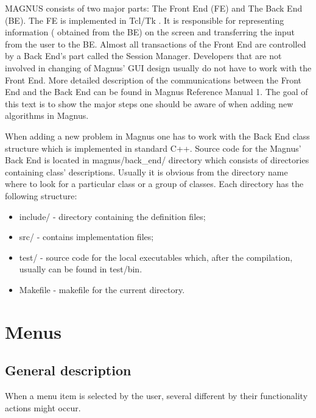 \documentclass[12pt]{article}
\begin{document}
  \pagestyle{myheadings} 


          MAGNUS consists of two major parts: The Front End (FE) and  The Back End 
  (BE). 
  The FE is implemented in Tcl/Tk . It is responsible for representing information 
  ( 
  obtained from the BE) on the screen and transferring the input from the user to 
  the BE. 
  Almost all transactions of the Front End are controlled by a Back End's part 
  called the 
  Session Manager. Developers  that are not involved in changing of Magnus' GUI 
  design 
  usually do not have to work with the Front End. More detailed description of the 
  communications between the Front End and the Back End can be found in Magnus 
  Reference
   Manual 1. The goal of this text is to show the  major steps one should be aware 
  of 
  when  adding  new  algorithms in Magnus.

          When adding a new problem in Magnus  one has to work with the Back End 
  class 
  structure  which  is implemented  in standard C++.
  Source code for the Magnus' Back End is located in magnus/back\_end/ directory 
  which
  consists of directories containing class' descriptions. Usually it is obvious 
  from the
   directory name where to look for a particular class or a group of classes. Each
   directory has the following structure: 

  \begin{itemize}
  \item include/ - directory containing the definition files;
  \item src/ - contains implementation files;
  \item test/ -  source code for the local executables which, after the 
  compilation,
   usually can be found in test/bin.
  \item Makefile - makefile for the current directory.
  \end{itemize}

  \section{Menus}

  \subsection{General description}
  When a menu item is selected by the user, several different
  by their functionality  actions might occur. 
\end{document}
